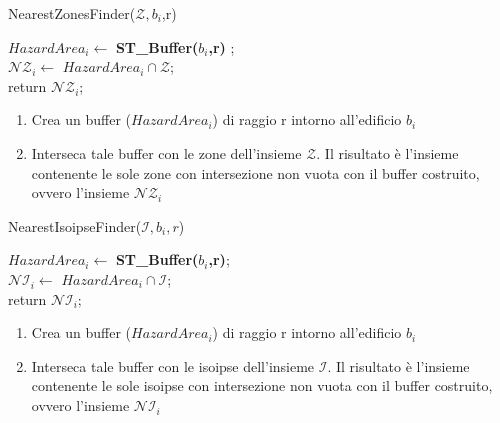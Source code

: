 \begin{algorithm}[H]
	
	\IncMargin{1em}
	\caption{NearestZonesFinder($\mathcal{Z},b_i$,r)}
	\label{alg:1}
	\BlankLine
	\SetAlgoNoLine
	$ HazardArea_i  \leftarrow $ \textbf{ST\_Buffer($b_i$,r)} ; \\ 
	$ \mathcal{NZ}_i  \leftarrow $ $HazardArea_i \cap \mathcal{Z}$; \\
	return $\mathcal{NZ}_i$;
	
\end{algorithm}

\begin{enumerate}
	\item Crea un buffer ($ HazardArea_i $) di raggio r intorno all'edificio $b_i$
	\item Interseca tale buffer con le zone dell’insieme $\mathcal{Z}$. Il risultato è l’insieme contenente le sole zone con intersezione non vuota con il buffer costruito, ovvero l’insieme  $\mathcal{NZ}_i$
\end{enumerate}

\begin{algorithm}[H]
	
	
	\IncMargin{1em}
	\caption{NearestIsoipseFinder($\mathcal{I},b_i,r$)}
	\label{alg:two}
	\BlankLine
	\SetAlgoNoLine
	$  HazardArea_i   \leftarrow $ \textbf{ST\_Buffer($b_i$,r)}; \\
	$ \mathcal{NI}_i \leftarrow $ $HazardArea_i \cap \mathcal{I} $; \\
	return $\mathcal{NI}_i;$
\end{algorithm}
\begin{enumerate}
	\item Crea un buffer ($ HazardArea_i $) di raggio r intorno all'edificio $b_i$
	\item Interseca tale buffer con le isoipse dell’insieme $\mathcal{I}$. Il risultato è l’insieme contenente le sole isoipse con intersezione non vuota con il buffer costruito, ovvero l’insieme  $\mathcal{NI}_i$
\end{enumerate}

